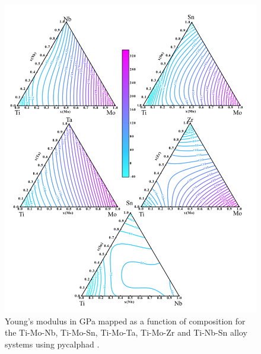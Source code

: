 \pagebreak
\begin{figure}[H]
	\centering
	\includegraphics[width=\textwidth]{Chapter-6/Figures/tixymap1.png}
	\caption{Young's modulus in GPa mapped as a function of composition for the Ti-Mo-Nb, Ti-Mo-Sn, Ti-Mo-Ta, Ti-Mo-Zr and Ti-Nb-Sn alloy systems using pycalphad \cite{Otis2017}.}
	\label{Ch6-figure:tixymap1}
\end{figure}

